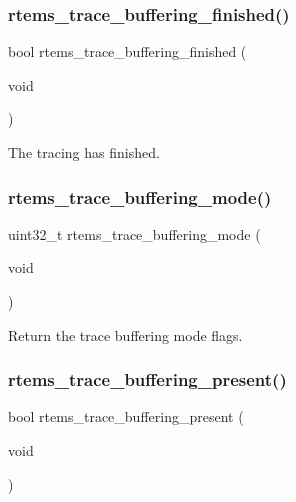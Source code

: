 \subsubsection{\texorpdfstring{rtems\_trace\_buffering\_finished()}{rtems\_trace\_buffering\_finished()}}
{\footnotesize\ttfamily bool rtems\+\_\+trace\+\_\+buffering\+\_\+finished (\begin{DoxyParamCaption}\item[{void}]{ }\end{DoxyParamCaption})}

The tracing has finished. \mbox{\label{rtems-trace-buffer-vars_8h_a0e668f3e3a4d2f085b376efac65216d6}} 
\subsubsection{\texorpdfstring{rtems\_trace\_buffering\_mode()}{rtems\_trace\_buffering\_mode()}}
{\footnotesize\ttfamily uint32\+\_\+t rtems\+\_\+trace\+\_\+buffering\+\_\+mode (\begin{DoxyParamCaption}\item[{void}]{ }\end{DoxyParamCaption})}

Return the trace buffering mode flags. \mbox{\label{rtems-trace-buffer-vars_8h_a0bff82b835c83c6cc5d4ab4e9af5c2fd}} 
\subsubsection{\texorpdfstring{rtems\_trace\_buffering\_present()}{rtems\_trace\_buffering\_present()}}
{\footnotesize\ttfamily bool rtems\+\_\+trace\+\_\+buffering\+\_\+present (\begin{DoxyParamCaption}\item[{void}]{ }\end{DoxyParamCaption})}

